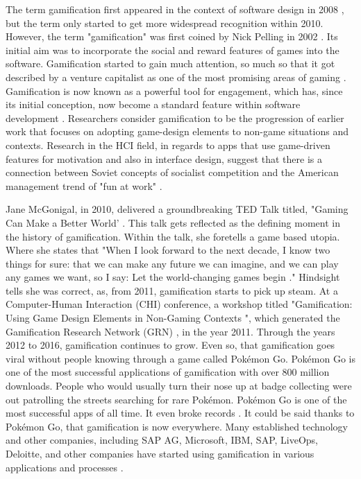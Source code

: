 	The term gamification first appeared in the context of software design in 2008 \cite{4}, but the term only started to get more widespread recognition within 2010. However, the term "gamification" was first coined by Nick Pelling in 2002 \cite{3e}. Its initial aim was to incorporate the social and reward features of games into the software. Gamification started to gain much attention, so much so that it got described by a venture capitalist as one of the most promising areas of gaming \cite{5}. Gamification is now known as a powerful tool for engagement, which has, since its initial conception, now become a standard feature within software development \cite{3e}. Researchers consider gamification to be the progression of earlier work that focuses on adopting game-design elements to non-game situations and contexts. Research in the HCI field, in regards to apps that use game-driven features for motivation and also in interface design, suggest that there is a connection between Soviet concepts of socialist competition and the American management trend of "fun at work" \cite{5}. 
	
	Jane McGonigal, in 2010, delivered a groundbreaking TED Talk titled, "Gaming Can Make a Better World' \cite{6}. This talk gets reflected as the defining moment in the history of gamification. Within the talk, she foretells a game based utopia. Where she states that "When I look forward to the next decade, I know two things for sure: that we can make any future we can imagine, and we can play any games we want, so I say: Let the world-changing games begin \cite{6}." Hindsight tells she was correct, as, from 2011, gamification starts to pick up steam.  At a Computer-Human Interaction (CHI) conference, a workshop titled "Gamification: Using Game Design Elements in Non-Gaming Contexts \cite{7}", which generated the Gamification Research Network (GRN) \cite{11}, in the year 2011. Through the years 2012 to 2016, gamification continues to grow. Even so, that gamification goes viral without people knowing through a game called Pokémon Go. Pokémon Go is one of the most successful applications of gamification with over 800 million downloads. People who would usually turn their nose up at badge collecting were out patrolling the streets searching for rare Pokémon. Pokémon Go is one of the most successful apps of all time. It even broke records \cite{3e,8}. It could be said thanks to Pokémon Go, that gamification is now everywhere. Many established technology and other companies, including SAP AG, Microsoft, IBM, SAP, LiveOps, Deloitte, and other companies have started using gamification in various applications and processes \cite{9}. 
	
